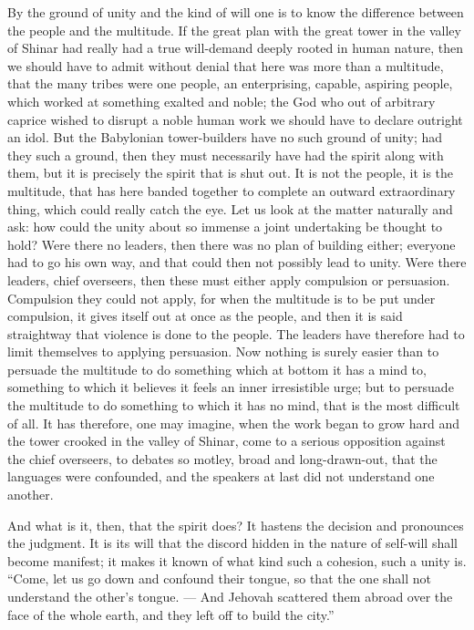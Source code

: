 \documentclass[12pt,a4paper,openany]{book}
\newcommand{\opage}[1]{\marginnote{\footnotesize\textit{[#1]}}}
\begin{document}
By the ground of unity and the kind of will one is to
know the difference between the people and the multitude. If
the great plan with the great tower in the valley of Shinar
had really had a true will-demand deeply rooted
in human nature, then we should have to admit without denial
that here was more than a multitude, that the many
tribes were one people, an enterprising, capable, aspiring
people, which worked at something exalted and noble;
the God who out of arbitrary caprice wished to disrupt a
noble human work we should have to declare outright
an idol. But the Babylonian tower-builders have no
such ground of unity; had they such a ground,
then they must necessarily have had the spirit along with them, but
it is precisely the spirit that is shut out. It is not
the people, it is the multitude, that has here banded together
to complete an outward extraordinary thing, which could
really catch the eye. Let us look at the matter naturally and
ask: how could the unity about so immense a
joint undertaking be thought to hold? Were
\setcounter{footnote}{0}%
\opage{16}there no leaders, then there was no plan of building either;
everyone had to go his own way, and that could
then not possibly lead to unity. Were there leaders, chief overseers,
then these must either apply compulsion
or persuasion. Compulsion they could not apply, for
when the multitude is to be put under compulsion, it gives itself out
at once as the people, and then it is said straightway that
violence is done to the people. The leaders have therefore
had to limit themselves to applying persuasion. Now
nothing is surely easier than to persuade the multitude
to do something which at bottom it has a mind to,
something to which it believes it feels an inner irresistible
urge; but to persuade the multitude to do something
to which it has no mind, that is the most difficult of
all. It has therefore, one may imagine, when the work
began to grow hard and the tower crooked in the valley of
Shinar, come to a serious opposition against the chief overseers,
to debates so motley, broad and
long-drawn-out, that the languages were confounded, and the speakers at last
did not understand one another.

And what is it, then, that the spirit does? It hastens
the decision and pronounces the judgment. It is its will that
the discord hidden in the nature of self-will shall become
manifest; it makes it known of what kind such a
cohesion, such a unity is. ``Come,
let us go down and confound their tongue, so
that the one shall not understand the other's tongue.
--- And Jehovah scattered them abroad over the face of the whole earth,
and they left off to build the city.''
\end{document}
